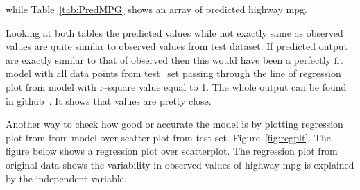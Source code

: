  while Table~\ref{tab:PredMPG} shows an array of 
 predicted highway mpg. 
 
 \begin{table}[htb]
    \caption{Array of Predicted Highway MPG from  Model}
    \label{tab:PredMPG}
\end{table}
 
 Looking at both tables the predicted values while 
 not exactly same as observed values are quite similar to observed values 
 from test dataset. If predicted output are exactly similar to that of 
 observed then this would have been a 
 perfectly fit model with all data points from test\_set passing through the
 line of regression plot from model with r--square value equal to 1.
 The whole output can be found in github~\cite{hid-sp18-415-analysis}.
 It shows that values are pretty close.
 
 Another way to check how good or accurate the model is by plotting regression 
 plot from from model over scatter plot from test set. 
 Figure~\ref{fig:regplt}. The figure below shows a regression plot
 over scatterplot. The regression plot from original data shows the variability
 in observed values of highway mpg is explained by the independent variable.
 
